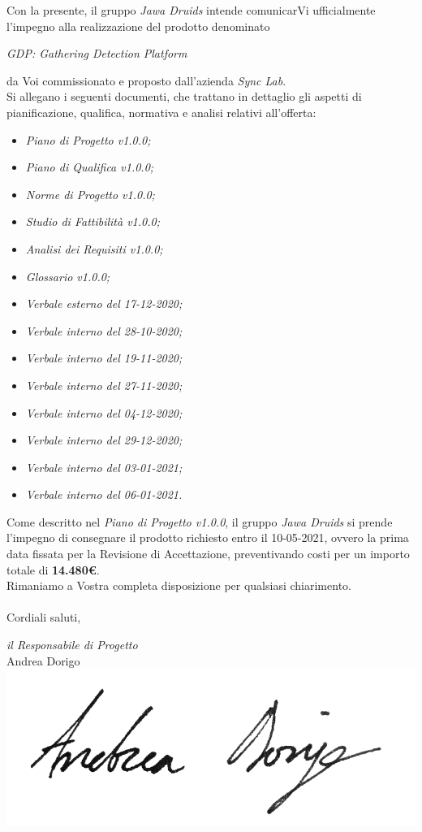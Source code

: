 \documentclass[a4paper,12pt]{report}
\begin{document}
Con la presente, il gruppo \textit{Jawa Druids} intende comunicarVi ufficialmente l’impegno alla realizzazione del prodotto denominato
\begin{center}
  \textit{GDP: Gathering Detection Platform}
\end{center}
da Voi commissionato e proposto dall'azienda \textit{Sync Lab}.
\vspace{1cm}
\\
Si allegano i seguenti documenti, che trattano in dettaglio gli aspetti di pianificazione, qualifica, normativa e analisi relativi all'offerta:
\begin{itemize}
  \item \textit{Piano di Progetto v1.0.0;}
  \item \textit{Piano di Qualifica v1.0.0;}
  \item \textit{Norme di Progetto v1.0.0;}
  \item \textit{Studio di Fattibilità v1.0.0;}
  \item \textit{Analisi dei Requisiti v1.0.0;}
  \item \textit{Glossario v1.0.0;}
  \item \textit{Verbale esterno del 17-12-2020;}
  \item \textit{Verbale interno del 28-10-2020;}
  \item \textit{Verbale interno del 19-11-2020;}
  \item \textit{Verbale interno del 27-11-2020;}
  \item \textit{Verbale interno del 04-12-2020;}
  \item \textit{Verbale interno del 29-12-2020;}
  \item \textit{Verbale interno del 03-01-2021;}
  \item \textit{Verbale interno del 06-01-2021.}
\end{itemize}
\vspace{0.7cm}

Come descritto nel \textit{Piano di Progetto v1.0.0}, il gruppo \textit{Jawa Druids} si prende l’impegno di consegnare il prodotto richiesto entro il 10-05-2021, ovvero la prima data fissata per la Revisione di Accettazione, preventivando costi per un importo totale di \textbf{14.480\euro}.\\
Rimaniamo a Vostra completa disposizione per qualsiasi chiarimento.\\
\vspace{0.3cm}
\\
Cordiali saluti,
\begin{flushright}
  \textit{il Responsabile di Progetto} \\
  Andrea Dorigo \\
  \includegraphics[width=0.3\linewidth]{immagini/firme/firma_andrea_dorigo.png}\\[4ex]
\end{flushright}
\end{document}
